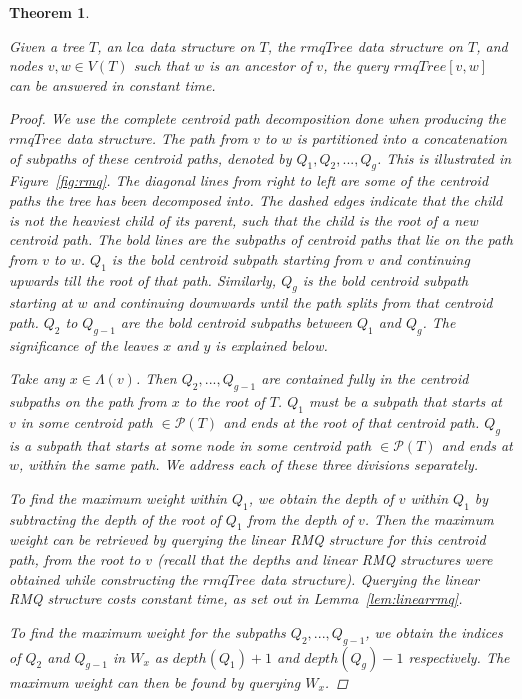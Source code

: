 \documentclass{article}
\newcommand{\leafset}{\Lambda}
\newtheorem{rmqquery}[incompatibility]{Theorem}
\begin{document}
    \medskip
    \begin{rmqquery}
        \label{lem:rmqquery}

        Given a tree $T$, an $lca$ data structure on $T$, the $rmqTree$ data structure on $T$, and nodes $v, w \in V(T)$ such that $w$ is an ancestor of $v$, the query $rmqTree[v, w]$ can be answered in constant time.

        \begin{proof}
            We use the complete centroid path decomposition done when producing the $rmqTree$ data structure. The path from $v$ to $w$ is partitioned into a concatenation of subpaths of these centroid paths, denoted by $Q_1, Q_2, ..., Q_g$. This is illustrated in Figure~\ref{fig:rmq}. The diagonal lines from right to left are some of the centroid paths the tree has been decomposed into. The dashed edges indicate that the child is not the heaviest child of its parent, such that the child is the root of a new centroid path. The bold lines are the subpaths of centroid paths that lie on the path from $v$ to $w$. $Q_1$ is the bold centroid subpath starting from $v$ and continuing upwards till the root of that path. Similarly, $Q_g$ is the bold centroid subpath starting at $w$ and continuing downwards until the path splits from that centroid path. $Q_2$ to $Q_{g - 1}$ are the bold centroid subpaths between $Q_1$ and $Q_g$. The significance of the leaves $x$ and $y$ is explained below.

            Take any $x \in \leafset(v)$. Then $Q_2, ..., Q_{g - 1}$ are contained fully in the centroid subpaths on the path from $x$ to the root of $T$. $Q_1$ must be a subpath that starts at $v$ in some centroid path $\in \mathcal{P}(T)$ and ends at the root of that centroid path. $Q_g$ is a subpath that starts at some node in some centroid path $\in \mathcal{P}(T)$ and ends at $w$, within the same path. We address each of these three divisions separately.

            To find the maximum weight within $Q_1$, we obtain the depth of $v$ within $Q_1$ by subtracting the depth of the root of $Q_1$ from the depth of $v$. Then the maximum weight can be retrieved by querying the linear RMQ structure for this centroid path, from the root to $v$ (recall that the depths and linear RMQ structures were obtained while constructing the $rmqTree$ data structure). Querying the linear RMQ structure costs constant time, as set out in Lemma~\ref{lem:linearrmq}.

            To find the maximum weight for the subpaths $Q_2, ..., Q_{g - 1}$, we obtain the indices of $Q_2$ and $Q_{g-1}$ in $W_x$ as $depth(Q_1) + 1$ and $depth(Q_g) - 1$ respectively. The maximum weight can then be found by querying $W_x$.


\end{proof}
\end{rmqquery}
\end{document}
